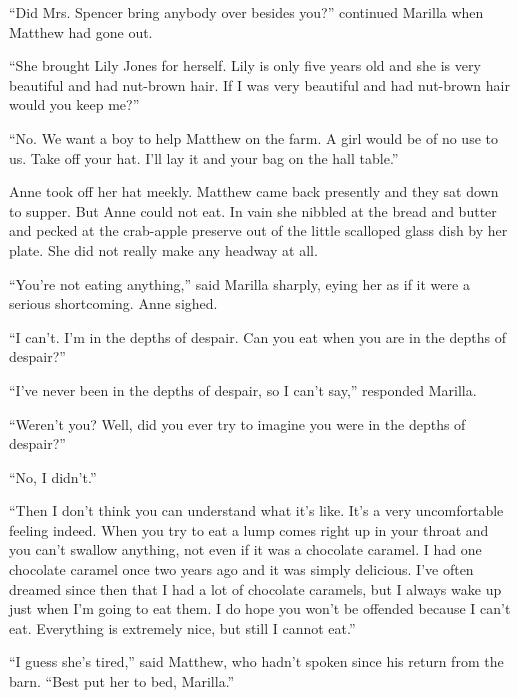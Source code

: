 \documentclass[a4paper]{article}
\begin{document}
\textsf{``Did Mrs. Spencer bring anybody over besides you?'' continued Marilla when Matthew had gone out.}

\textsf{``She brought Lily Jones for herself. Lily is only five years old and she is very beautiful and had nut-brown hair. If I was very beautiful and had nut-brown hair would you keep me?''}

\sffamily``No. We want a boy to help Matthew on the farm. A girl would be of no use to us. Take off your hat. I'll lay it and your bag on the hall table.''

 Anne took off her hat meekly. Matthew came back presently and they sat down to supper. But Anne could not eat. In vain she nibbled at the bread and butter and pecked at the crab-apple preserve out of the little scalloped glass dish by her plate. She did not really make any headway at all.

``You're not eating anything,'' said Marilla sharply, eying her as if it were a serious shortcoming. Anne sighed.

\textrm{``I can't. I'm in the depths of despair. Can you eat when you are in the depths of despair?''}

\textrm{``I've never been in the depths of despair, so I can't say,'' responded Marilla.}

\textrm{``Weren't you? Well, did you ever try to imagine you were in the depths of despair?''}

\rmfamily``No, I didn't.''

``Then I don't think you can understand what it's like. It's a very uncomfortable feeling indeed. When you try to eat a lump comes right up in your throat and you can't swallow anything, not even if it was a chocolate caramel. I had one chocolate caramel once two years ago and it was simply delicious. I've often dreamed since then that I had a lot of chocolate caramels, but I always wake up just when I'm going to eat them. I do hope you won't be offended because I can't eat. Everything is extremely nice, but still I cannot eat.''

``I guess she's tired,'' said Matthew, who hadn't spoken since his return from the barn. ``Best put her to bed, Marilla.''
\end{document}
